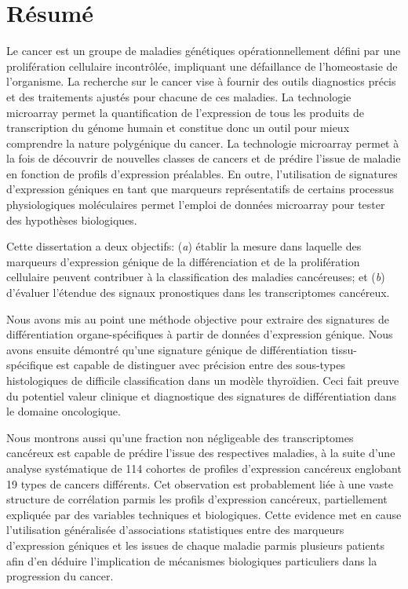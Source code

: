 \chapter*{Résumé}

Le cancer est un groupe de maladies génétiques opérationnellement défini par une
prolifération cellulaire incontrôlée, impliquant une défaillance de
l'homeostasie de l'organisme.  La recherche sur le cancer vise à fournir des
outils diagnostics précis et des traitements ajustés pour chacune de ces
maladies.  La technologie microarray permet la quantification de l'expression de
tous les produits de transcription du génome humain et constitue donc un outil
pour mieux comprendre la nature polygénique du cancer.  La technologie
microarray permet à la fois de découvrir de nouvelles classes de cancers et de
prédire l'issue de maladie en fonction de profils d'expression préalables.  En
outre, l'utilisation de signatures d'expression géniques en tant que marqueurs
représentatifs de certains processus physiologiques moléculaires permet
l'emploi de données microarray pour tester des hypothèses biologiques.

Cette dissertation a deux objectifs: (\emph{a}) établir la mesure dans laquelle
des marqueurs d'expression génique de la différenciation et de la prolifération
cellulaire peuvent contribuer à la classification des maladies cancéreuses; et
(\emph{b}) d'évaluer l'étendue des signaux pronostiques dans les transcriptomes
cancéreux.

Nous avons mis au point une méthode objective pour extraire des signatures de
différentiation organe-spécifiques à partir de données d'expression génique.
Nous avons ensuite démontré qu'une signature génique de différentiation
tissu-spécifique est capable de distinguer avec précision entre des sous-types
histologiques de difficile classification dans un modèle thyroïdien.  Ceci fait
preuve du potentiel valeur clinique et diagnostique des signatures de
différentiation dans le domaine oncologique.

Nous montrons aussi qu'une fraction non négligeable des transcriptomes cancéreux
est capable de prédire l'issue des respectives maladies, à la suite d'une
analyse systématique de 114 cohortes de profiles d'expression cancéreux
englobant 19 types de cancers différents.  Cet observation est probablement liée
à une vaste structure de corrélation parmis les profils d'expression cancéreux,
partiellement expliquée par des variables techniques et biologiques.  Cette
evidence met en cause l'utilisation généralisée d'associations statistiques
entre des marqueurs d'expression géniques et les issues de chaque maladie parmis
plusieurs patients afin d'en déduire l'implication de mécanismes biologiques
particuliers dans la progression du cancer.

